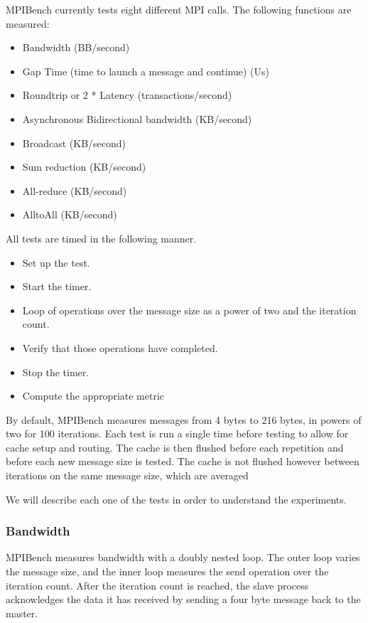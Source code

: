 MPIBench currently tests eight different MPI calls. The following functions are
measured:

\begin{itemize}
    \item Bandwidth (BB/second)
    \item Gap Time (time to launch a message and continue) (Us)
    \item Roundtrip or 2 * Latency (transactions/second)
    \item Asynchronous Bidirectional bandwidth (KB/second)
    \item Broadcast (KB/second)
    \item Sum reduction (KB/second)
    \item All-reduce (KB/second)
    \item AlltoAll (KB/second)
\end{itemize}



All tests are timed in the following manner.

\begin{itemize}
    \item Set up the test.
    \item Start the timer.
    \item Loop of operations over the message size as a power of two and the
iteration count.
    \item Verify that those operations have completed.
    \item Stop the timer.
    \item Compute the appropriate metric
\end{itemize}

By default, MPIBench measures messages from 4 bytes to 216 bytes, in powers of
two for 100 iterations. Each test is run a single time before testing to allow
for cache setup and routing. The cache is then flushed before each repetition
and before each new message size is tested. The cache is not flushed however
between iterations on the same message size, which are averaged

We will describe each one of the tests in order to understand the experiments.


\subsubsection{Bandwidth}

MPIBench measures bandwidth with a doubly nested loop. The outer loop varies the
message size, and the inner loop measures the send operation over the
iteration count. After the iteration count is reached, the slave process
acknowledges the data it has received by sending a four byte message back to
the master. 

